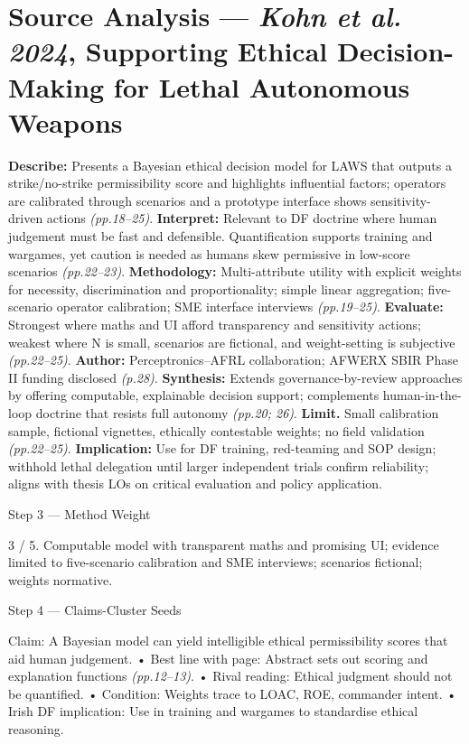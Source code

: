 \section*{Source Analysis — \textit{Kohn et al. 2024}, Supporting Ethical Decision-Making for Lethal Autonomous Weapons}
\textbf{Describe:} Presents a Bayesian ethical decision model for LAWS that outputs a strike/no-strike permissibility score and highlights influential factors; operators are calibrated through scenarios and a prototype interface shows sensitivity-driven actions \emph{(pp.18–25)}.
\textbf{Interpret:} Relevant to DF doctrine where human judgement must be fast and defensible. Quantification supports training and wargames, yet caution is needed as humans skew permissive in low-score scenarios \emph{(pp.22–23)}.
\textbf{Methodology:} Multi-attribute utility with explicit weights for necessity, discrimination and proportionality; simple linear aggregation; five-scenario operator calibration; SME interface interviews \emph{(pp.19–25)}.
\textbf{Evaluate:} Strongest where maths and UI afford transparency and sensitivity actions; weakest where N is small, scenarios are fictional, and weight-setting is subjective \emph{(pp.22–25)}.
\textbf{Author:} Perceptronics–AFRL collaboration; AFWERX SBIR Phase II funding disclosed \emph{(p.28)}.
\textbf{Synthesis:} Extends governance-by-review approaches by offering computable, explainable decision support; complements human-in-the-loop doctrine that resists full autonomy \emph{(pp.20; 26)}.
\textbf{Limit.} Small calibration sample, fictional vignettes, ethically contestable weights; no field validation \emph{(pp.22–25)}. \textbf{Implication:} Use for DF training, red-teaming and SOP design; withhold lethal delegation until larger independent trials confirm reliability; aligns with thesis LOs on critical evaluation and policy application.

Step 3 — Method Weight

3 / 5. Computable model with transparent maths and promising UI; evidence limited to five-scenario calibration and SME interviews; scenarios fictional; weights normative.

Step 4 — Claims-Cluster Seeds

Claim: A Bayesian model can yield intelligible ethical permissibility scores that aid human judgement.
• Best line with page: Abstract sets out scoring and explanation functions \emph{(pp.12–13)}.
• Rival reading: Ethical judgment should not be quantified.
• Condition: Weights trace to LOAC, ROE, commander intent.
• Irish DF implication: Use in training and wargames to standardise ethical reasoning.

